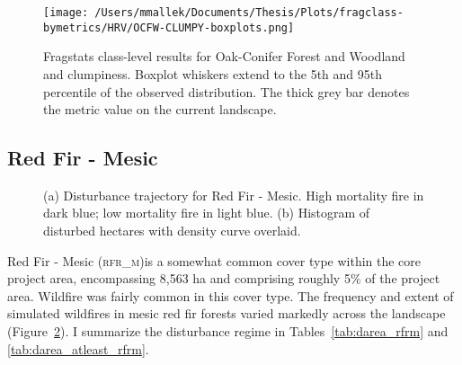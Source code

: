 \begin{figure}[!htbp]
\centering
    \texttt{[image: /Users/mmallek/Documents/Thesis/Plots/fragclass-bymetrics/HRV/OCFW-CLUMPY-boxplots.png]}
  \caption{Fragstats class-level results for Oak-Conifer Forest and Woodland and clumpiness. Boxplot whiskers extend to the 5th and 95th percentile of the observed distribution. The thick grey bar denotes the metric value on the current landscape.}
  \label{fig:ocfw_clumpy}
\end{figure}



\clearpage
\subsection{Red Fir - Mesic} 
\begin{figure}[!htbp]
  \centering
  \caption{\small (a) Disturbance trajectory for Red Fir - Mesic. High mortality fire in dark blue; low mortality fire in light blue. (b) Histogram of disturbed hectares with density curve overlaid.} 
  \label{fig:darea_rfrm}
\end{figure}

Red Fir - Mesic (\textsc{rfr\_m})is a somewhat common cover type within the core project area, encompassing 8,563 ha and comprising roughly 5\% of the project area. Wildfire was fairly common in this cover type. The frequency and extent of simulated wildfires in mesic red fir forests varied markedly across the landscape (Figure~\ref{fig:darea_rfrm}). I summarize the disturbance regime in Tables~\ref{tab:darea_rfrm} and \ref{tab:darea_atleast_rfrm}.


